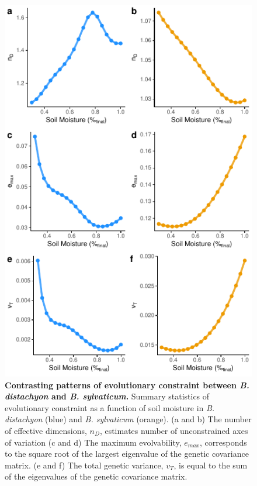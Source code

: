 \documentclass[jou,floatsintext]{apa6}
\begin{document}
\begin{figure}[!h]
\includegraphics[width=\textwidth]{../Figures/constraints_byspecies} \caption{\textbf{Contrasting patterns of evolutionary constraint between \emph{B. distachyon} and \emph{B. sylvaticum}.} Summary statistics of evolutionary constraint as a function of soil moisture in \emph{B. distachyon} (blue) and \emph{B. sylvaticum} (orange). (a and b) The number of effective dimensions, \(n_D\), estimates number of unconstrained axes of variation (c and d) The maximum evolvability, \(e_{max}\), corresponds to the square root of the largest eigenvalue of the genetic covariance matrix. (e and f) The total genetic variance, \(v_T\), is equal to the sum of the eigenvalues of the genetic covariance matrix.}\label{fig:constraints}
\end{figure}
\end{document}
